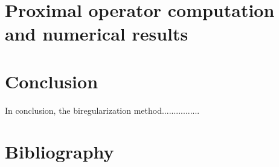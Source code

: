 \documentclass{article}
\begin{document}
\section{Proximal operator computation and numerical results}




\section*{Conclusion}

In conclusion, the biregularization method................



\section{Bibliography}
\nocite{*}
\printbibliography
\end{document}
